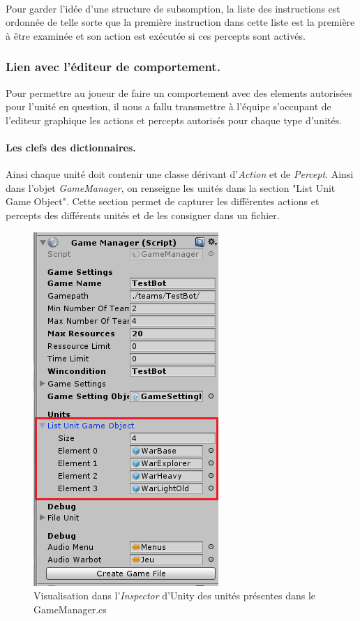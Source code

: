 \documentclass{report}
\begin{document}
\paragraph{}Pour garder l'idée d'une structure de subsomption, la liste des instructions est ordonnée de telle sorte que la première instruction dans cette liste est la première à être examinée et son action est exécutée si ces percepts sont activés.
\subsubsection{Lien avec l'éditeur de comportement.}
Pour permettre au joueur de faire un comportement avec des elements autorisées pour l'unité en question, il nous a fallu transmettre à l'équipe s'occupant de l'editeur graphique les actions et percepts autorisés pour chaque type d'unités.
\paragraph{Les clefs des dictionnaires.} Ainsi chaque unité doit contenir une classe dérivant d'\textit{Action} et de \textit{Percept}.
Ainsi dans l'objet \textit{GameManager}, on renseigne les unités dans la section "List Unit Game Object". Cette section permet de capturer les différentes actions et percepts des différents unités et de les consigner dans un fichier.
\begin{figure}[!h]
\centering
\includegraphics{GameManagerImage}
\caption{Visualisation dans l'\textit{Inspector} d'Unity des unités présentes dans le GameManager.cs}
\end{figure}
\end{document}
